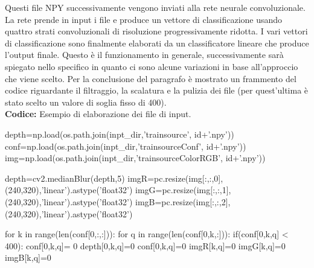Questi file NPY successivamente vengono inviati alla rete neurale convoluzionale. La rete prende in input i file e produce un vettore di classificazione usando quattro strati convoluzionali di risoluzione progressivamente ridotta. I vari vettori di classificazione sono finalmente elaborati da un classificatore lineare che %
produce l'output finale. Questo è il funzionamento in generale, successivamente sarà spiegato nello specifico in quanto ci sono alcune variazioni in base all'approccio che viene scelto.
Per la conclusione del paragrafo è mostrato un frammento del codice riguardante il filtraggio, la scalatura e la pulizia dei file (per quest'ultima è stato scelto un valore di soglia fisso di 400).\\

\textbf{Codice:} Esempio di elaborazione dei file di input. 
\begin{python}

depth=np.load(os.path.join(inpt_dir,'trainsource', id+'.npy'))
conf=np.load(os.path.join(inpt_dir,'trainsourceConf', id+'.npy'))
img=np.load(os.path.join(inpt_dir,'trainsourceColorRGB', id+'.npy'))
        
depth=cv2.medianBlur(depth,5)
imgR=pc.resize(img[:,:,0],(240,320),'linear').astype('float32')
imgG=pc.resize(img[:,:,1],(240,320),'linear').astype('float32')
imgB=pc.resize(img[:,:,2],(240,320),'linear').astype('float32')

for k in range(len(conf[0,:,:])):
    for q in range(len(conf[0,k,:])):
        if(conf[0,k,q] < 400):
	 conf[0,k,q]= 0
            depth[0,k,q]=0
            conf[0,k,q]=0
            imgR[k,q]=0
            imgG[k,q]=0
            imgB[k,q]=0
\end{python}